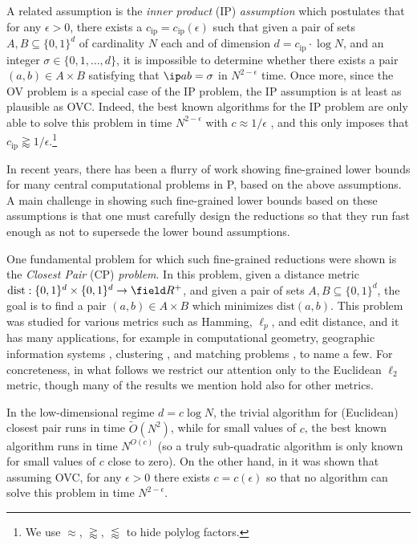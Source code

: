 \documentclass[11pt]{article}
\theoremstyle{plain}
\theoremstyle{remark}
\newcommand{\iP}{\mathrm{ip}}
\newcommand{\dist}{\mathrm{dist}}
\newcommand{\polylog}{\mathrm{polylog}}
\begin{document}
A related assumption is the \emph{inner product} (IP) \emph{assumption} which postulates that for any $\epsilon>0$, there exists a $c_{\iP}= c_{\iP}(\epsilon)$ such that given a pair of sets $A,B\subseteq\{0,1\}^{d}$ of cardinality $N$ each and of dimension $d = c_{\iP} \cdot \log N$, and an integer $\sigma \in \{0,1,\ldots,d\}$,  it is impossible to determine whether there exists a pair $(a,b)\in A\times B$
satisfying that $\ip a b=\sigma$ in $N^{2-\epsilon}$ time. Once more, since the OV problem is a special case of the IP problem, the IP assumption is at least as plausible as OVC. Indeed, the best known algorithms for the IP problem are only able to solve this problem in time $N^{2-\epsilon}$ with $c \approx 1/\epsilon$ \cite{AW15}, and this only imposes that $c_{\iP} \gtrapprox  1/\epsilon$.\footnote{We use $\approx$, $\gtrapprox$, $\lessapprox$ to hide $\polylog$ factors.} 
 
In recent years, there has been a flurry of work showing fine-grained lower bounds for many central computational problems in P, based on the above assumptions.  A main challenge in showing such fine-grained lower bounds based on these assumptions  is that one must carefully design the reductions so that they run fast enough as not to supersede the lower bound assumptions. 

One fundamental problem for which such fine-grained reductions were shown is the
\emph{Closest Pair}  (CP) \emph{problem}. In this problem, given a distance metric $\dist: \{0,1\}^d \times \{0,1\}^d \to \field R^+$, and given a pair of sets $A,B\subseteq\{0,1\}^{d}$, the goal is to find a pair $(a,b)\in A\times B$ which minimizes $\dist(a,b)$. 
This problem was studied for various metrics such as Hamming, $\ell_{p}$, and edit distance, and it has many applications, for example in computational geometry, geographic
information systems \cite{Hen06}, clustering \cite{Zah71,Alp10},
and matching problems \cite{WTFX07}, to name a few.
For concreteness, in what follows we restrict our attention only to the Euclidean $\ell_2$ metric, though many of the results we mention hold also for other metrics. 

In the low-dimensional regime $d = c \log N$, the trivial algorithm for (Euclidean) closest pair runs in time $\tilde O(N^2)$, while for small values of $c$,
the best known algorithm  runs in time $N^{O(c)}$
\cite{Rabin76, KM95} (so a truly sub-quadratic algorithm is only known for small values of $c$ close to zero).
  On the other hand, in \cite{AW15} it was shown that assuming OVC, for any $\epsilon>0$ there exists $c = c(\epsilon)$ so that
no algorithm can solve this problem in time $N^{2-\epsilon}$.
\end{document}
